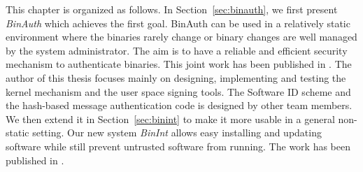 This chapter is organized as follows.
In Section~\ref{sec:binauth},
we first present {\em BinAuth} which achieves the first goal.
BinAuth can be used in a relatively static environment where the binaries 
rarely change or binary changes are well managed by the system administrator.
The aim is to have a reliable and efficient security mechanism
to authenticate binaries.
This joint work has been published in \cite{halim2008lightweight,wu2009esi}.
The author of this thesis focuses mainly on designing, implementing and testing
the kernel mechanism and the user space signing tools.
The Software ID scheme and the hash-based message authentication code
is designed by other team members.
We then extend it in Section~\ref{sec:binint} to make it more usable
in a general non-static setting.
Our new system {\em BinInt} allows easy installing and updating software
while still prevent untrusted software from running.
The work has been published in \cite{wu2011towards}.

